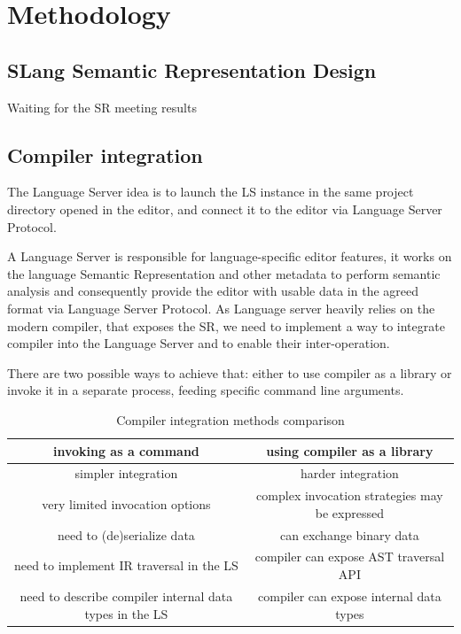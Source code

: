 \chapter{Methodology}
\label{chap:met}

\section{SLang Semantic Representation Design}
\label{sec:met:ir_design}
Waiting for the SR meeting results

\section{Compiler integration}
\label{sec:met:ls_compiler_interop}
The Language Server idea is to launch the LS instance in the same project directory
opened in the editor, and connect it to the editor via Language Server Protocol.

A Language Server is responsible for language-specific editor features, 
it works on the language Semantic Representation and other metadata 
to perform semantic analysis and consequently provide the editor with usable data in the agreed format via Language Server Protocol.
As Language server heavily relies on the modern compiler, that exposes the SR, 
we need to implement a way to integrate compiler into the Language Server and to enable their inter-operation.

There are two possible ways to achieve that: either to use compiler as a library or invoke it in a separate process, 
feeding specific command line arguments.
\begin{table}[H]
    \centering
    \begin{tabular}{|c|c|}
        \hline
        \textbf{invoking as a command} & \textbf{using compiler as a library} \\
        \hline
        simpler integration & harder integration \\ 
        \hline
        very limited invocation options & complex invocation strategies may be expressed \\
        \hline
        need to (de)serialize data & can exchange binary data \\
        \hline
        need to implement IR traversal in the LS & compiler can expose AST traversal API \\
        \hline
        need to describe compiler internal data types in the LS & compiler can expose internal data types \\
        \hline 
    \end{tabular}
    \caption{Compiler integration methods comparison}
    \label{table:met:compiler_integration}
\end{table}

